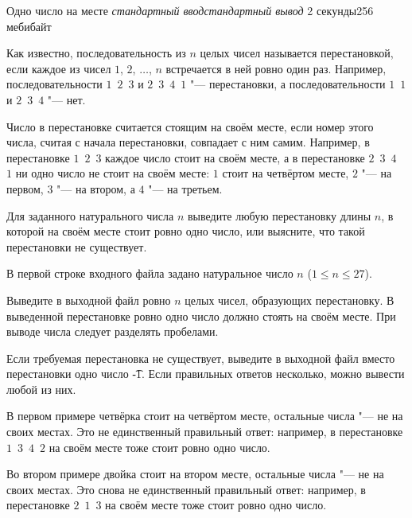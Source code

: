 
\gdef\thisproblemauthor{Иван Казменко}
\begin{problem}{Одно число на месте}
{\textsl{стандартный ввод}}{\textsl{стандартный вывод}}
{2 секунды}{256 мебибайт}{}

Как известно, последовательность из $n$ целых чисел называется перестановкой,
если каждое из чисел $1$, $2$, $\ldots$, $n$ встречается в ней ровно один раз.
Например, последовательности $1$~$2$~$3$ и $2$~$3$~$4$~$1$ "--- перестановки,
а последовательности $1$~$1$ и $2$~$3$~$4$ "--- нет.

Число в перестановке считается стоящим на своём месте, если номер этого
числа, считая с начала перестановки, совпадает с ним самим.
Например, в перестановке $1$~$2$~$3$ каждое число стоит на своём месте,
а в перестановке $2$~$3$~$4$~$1$ ни одно число не стоит на своём месте:
$1$ стоит на четвёртом месте, $2$ "--- на первом, $3$ "--- на втором,
а $4$ "--- на третьем.

Для заданного натурального числа $n$ выведите любую перестановку длины $n$,
в которой на своём месте стоит ровно одно число,
или выясните, что такой перестановки не существует.

\InputFile

В первой строке входного файла задано натуральное число $n$
($1 \le n \le 27$).

\OutputFile

Выведите в выходной файл ровно $n$ целых чисел, образующих перестановку.
В выведенной перестановке ровно одно число должно стоять на своём месте.
При выводе числа следует разделять пробелами.

Если требуемая перестановка не существует, выведите в выходной файл
вместо перестановки одно число \t{-1}.
Если правильных ответов несколько, можно вывести любой из них.

\Examples

\begin{example}%
%
%
\end{example}

\Explanations

В первом примере четвёрка стоит на четвёртом месте,
остальные числа "--- не на своих местах.
Это не единственный правильный ответ: например,
в перестановке $1$~$3$~$4$~$2$ на своём месте тоже стоит ровно одно число.

Во втором примере двойка стоит на втором месте,
остальные числа "--- не на своих местах.
Это снова не единственный правильный ответ: например,
в перестановке $2$~$1$~$3$ на своём месте тоже стоит ровно одно число.

\end{problem}
